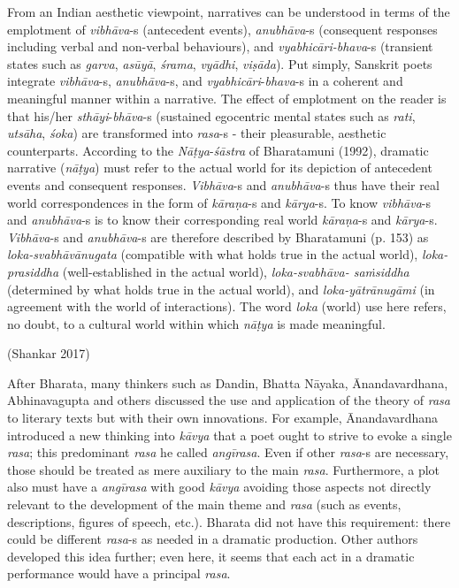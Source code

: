 \begin{myquote}
From an Indian aesthetic viewpoint, narratives can be understood in terms of the emplotment of \textsl{vibhāva}-s (antecedent events), \textsl{anubhāva}-s (consequent responses including verbal and non-verbal behaviours), and \textsl{vyabhicāri-bhava}-s (transient states such as \textsl{garva}, \textsl{asūyā}, \textsl{śrama}, \textsl{vyādhi}, \textsl{viṣāda}). Put simply, Sanskrit poets integrate \textsl{vibhāva}-s, \textsl{anubhāva}-s, and \textsl{vyabhicāri}-\textsl{bhava}-s in a coherent and meaningful manner within a narrative. The effect of emplotment on the reader is that his/her \textsl{sthāyi}-\textsl{bhāva}-s (sustained egocentric mental states such as \textsl{rati}, \textsl{utsāha}, \textsl{śoka}) are transformed into \textsl{rasa}-s - their pleasurable, aesthetic counterparts. According to the \textsl{Nāṭya}-\textsl{śāstra} of Bharatamuni (1992), dramatic narrative (\textsl{nāṭya}) must refer to the actual world for its depiction of antecedent events and consequent responses. \textsl{Vibhāva}-s and \textsl{anubhāva}-s thus have their real world correspondences in the form of \textsl{kāraṇa}-s and \textsl{kārya}-s. To know \textsl{vibhāva}-s and \textsl{anubhāva}-s is to know their corresponding real world \textsl{kāraṇa}-s and \textsl{kārya}-s. \textsl{Vibhāva}-s and \textsl{anubhāva}-s are therefore described by Bharatamuni (p. 153) as \textsl{loka-svabhāvānugata} (compatible with what holds true in the actual world), \textsl{loka-prasiddha} (well-established in the actual world), \textsl{loka-svabhāva- saṁsiddha} (determined by what holds true in the actual world), and \textsl{loka-yātrānugāmi} (in agreement with the world of interactions). The word \textsl{loka} (world) use here refers, no doubt, to a cultural world within which \textsl{nāṭya} is made meaningful. 

\hfill(Shankar 2017) 
\end{myquote}

After Bharata, many thinkers such as Dandin, Bhatta Nāyaka, Ānandavardhana, Abhinavagupta and others discussed the use and application of the theory of \textsl{rasa} to literary texts but with their own innovations. For example, Ānandavardhana introduced a new thinking into \textsl{kāvya} that a poet ought to strive to evoke a single \textsl{rasa}; this predominant \textsl{rasa} he called \textsl{angīrasa}. Even if other \textsl{rasa}-s are necessary, those should be treated as mere auxiliary to the main \textsl{rasa}. Furthermore, a plot also must have a \textsl{angīrasa} with good \textsl{kāvya} avoiding those aspects not directly relevant to the development of the main theme and \textsl{rasa} (such as events, descriptions, figures of speech, etc.). Bharata did not have this requirement: there could be different \textsl{rasa}-s as needed in a dramatic production. Other authors developed this idea further; even here, it seems that each act in a dramatic performance would have a principal \textsl{rasa}. 


